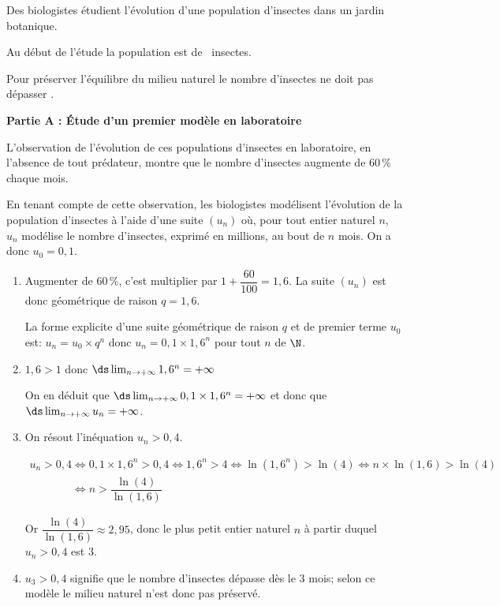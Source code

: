 \medskip

Des biologistes étudient l'évolution d'une population d'insectes dans un jardin botanique. 

Au début de l'étude la population est de ~insectes.

Pour préserver l'équilibre du milieu naturel le nombre d'insectes ne doit pas dépasser .

\bigskip

\textbf{Partie A : Étude d'un premier modèle en laboratoire}

\medskip

L'observation de l'évolution de ces populations d'insectes en laboratoire, en l'absence de tout prédateur, montre que le nombre d'insectes augmente de 60\,\% chaque mois.

En tenant compte de cette observation, les biologistes modélisent l'évolution de la population d'insectes à l'aide d'une suite $\left(u_n\right)$ où, pour tout entier naturel $n$, $u_n$ modélise le nombre d'insectes, exprimé en millions, au bout de $n$ mois. 
On a donc $u_0 = 0,1$.

\medskip

\begin{enumerate}
\item 
Augmenter de 60\,\%, c'est multiplier par $1+\dfrac{60}{100}=1,6$.
La suite $(u_n)$ est donc géométrique de raison $q=1,6$.

La forme explicite d'une suite géométrique de raison $q$ et de premier terme $u_0$ est: $u_n=u_0\times q^n$ donc $u_n = 0,1 \times 1,6^n$ pour tout $n$ de $\N$.

\item 
$1,6>1$ donc $\ds\lim_{n\to +\infty} 1,6^n = +\infty$

On en déduit que $\ds\lim_{n\to +\infty} 0,1\times 1,6^n = +\infty$ et donc que $\ds\lim_{n\to +\infty} u_n = +\infty$.

\item On résout l'inéquation $u_n > 0,4$.

$\begin{gathered}u_n>0,4
\iff
0,1\times 1,6^n >0,4
\iff
1,6^n >4
\iff
\ln\left (1,6^n\right ) > \ln(4)
\iff
n\times \ln(1,6)>\ln(4)\\
\phantom{u_n>0,4}
\iff
n>\dfrac{\ln(4)}{\ln(1,6)}\end{gathered}$

Or $\dfrac{\ln(4)}{\ln(1,6)}\approx 2,95$, donc le plus petit entier naturel $n$ à partir duquel $u_n>0,4$ est 3.

\item 
$u_3>0,4$ signifie que le nombre d'insectes dépasse  dès le 3\ieme{} mois; selon ce modèle le milieu naturel n'est donc pas préservé.

\end{enumerate}

